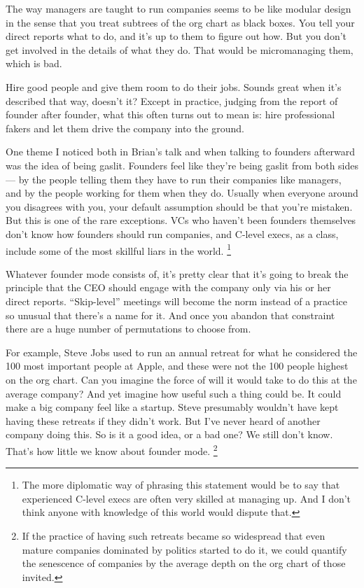 The way managers are taught to run companies seems to be like modular
design in the sense that you treat subtrees of the org chart as black
boxes. You tell your direct reports what to do, and it's up to them to
figure out how. But you don't get involved in the details of what they
do. That would be micromanaging them, which is bad.

Hire good people and give them room to do their jobs. Sounds great when
it's described that way, doesn't it? Except in practice, judging from
the report of founder after founder, what this often turns out to mean
is: hire professional fakers and let them drive the company into the
ground.

One theme I noticed both in Brian's talk and when talking to founders
afterward was the idea of being gaslit. Founders feel like they're being
gaslit from both sides --- by the people telling them they have to run
their companies like managers, and by the people working for them when
they do. Usually when everyone around you disagrees with you, your
default assumption should be that you're mistaken. But this is one of
the rare exceptions. VCs who haven't been founders themselves don't know
how founders should run companies, and C-level execs, as a class,
include some of the most skillful liars in the world.
\footnote{The more diplomatic way of phrasing this statement would be to
say that experienced C-level execs are often very skilled at managing
up. And I don't think anyone with knowledge of this world would dispute
that.}

Whatever founder mode consists of, it's pretty clear that it's going to
break the principle that the CEO should engage with the company only via
his or her direct reports. ``Skip-level'' meetings will become the norm
instead of a practice so unusual that there's a name for it. And once
you abandon that constraint there are a huge number of permutations to
choose from.

For example, Steve Jobs used to run an annual retreat for what he
considered the 100 most important people at Apple, and these were not
the 100 people highest on the org chart. Can you imagine the force of
will it would take to do this at the average company? And yet imagine
how useful such a thing could be. It could make a big company feel like
a startup. Steve presumably wouldn't have kept having these retreats if
they didn't work. But I've never heard of another company doing this. So
is it a good idea, or a bad one? We still don't know. That's how little
we know about founder mode. \footnote{If the practice of having such retreats became so widespread
that even mature companies dominated by politics started to do it, we
could quantify the senescence of companies by the average depth on the
org chart of those invited.}

